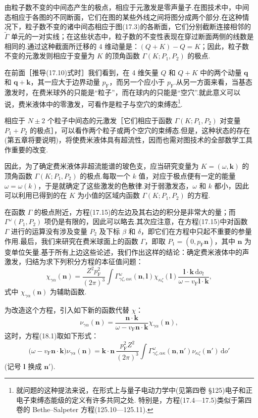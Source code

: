 由粒子数不变的中间态产生的极点，相应于元激发是零声量子.在图技术中，中间态相应于各图的不同断面，它们在图的某些外线之间将图分成两个部分.在这种情况下，粒子数不变的诸中间态相应于图(17.3)的各断面，它们分别截断连接相邻的 $\tilde{\Gamma}$ 单元的一对实线；在这些状态中，粒子数的不变性表现在穿过断面两侧的线数是相同的.通过这种截面所迁移的 4 维动量是：$(Q+K)-Q=K$；因此，粒子数不变的元激发则相应于变量为 $K$ 的顶角函数 $\Gamma(K;P_1,P_2)$ 的极点.

在前面［推导(17.10)式时］我们看到，在 4 维矢量 $Q$ 和 $Q+K$ 中的两个动量 $\bm q$ 和 $\bm q+\bm k$，其一应大于边界动量 $p_{\mathrm{F}}$，而另一个应小于 $p_{\mathrm{F}}$.从另一方面来看，当基态激发时，在费米球外的只能是“粒子”，而在球内的只能是“空穴”.就此意义可以说，费米液体中的零激发，可看作是粒子与空穴的束缚态\footnote{就问题的这种提法来说，在形式上与量子电动力学中(见第四卷 §125)电子和正电子束缚态能级的定义有许多共同之处. 特别是，方程(17.4—17.5)类似于第四卷的 Bethe--Salpeter 方程(125.10—125.11).}.

相应于 $N\pm2$ 个粒子中间态的元激发［它们相应于函数 $\Gamma(K;P_1,P_2)$ 对变量 $P_1+P_2$ 的极点］，可以看作两个粒子或两个空穴的束缚态.但是，这种状态的存在(第五章将要说明)，将使费米液体具有超流性，因而也需对图技术的全部数学工具作重要的改变.

因此，为了确定费米液体非超流能谱的玻色支，应当研究变量为 $K=(\omega,\bm{k})$ 的顶角函数 $\Gamma(K;P_1,P_2)$ 的极点.每取一个 $k$ 值，对应于极点便有一定的能量 $\omega=\omega(k)$，于是就确定了这些激发的色散律.对于弱激发态，$\omega$ 和 $k$ 都小，因此可以利用已得到的在 $K$ 为小值的区域内函数 $\Gamma(K;P_1,P_2)$ 的方程.

在函数 $\Gamma$ 的极点附近，方程(17.15)的左边及其右边的积分是非常大的量；而 $\Gamma^{\omega}(P_1,P_2)$ 项仍是有限的，因此可以略去.其次应注意，在方程(17.15)中对函数 $\Gamma$ 进行的运算没有涉及变量 $P_2$ 及下标 $\beta$ 和 $\delta$，即它们在方程中只起不重要的参量作用.最后，我们来研究在费米球面上的函数 $\Gamma$，即取 $P_1=(0,p_{\mathrm{F}}\bm{n})$，其中 $\bm n$ 为变单位矢量.基于所有上边这些论述，我们作出这样的结论：确定费米液体中的声激发，归结为求下列积分方程的本征值问题：
\begin{equation}
  \chi_{\gamma\alpha}(\bm{n})=\frac{Z^2p_{\mathrm{F}}^2}{(2\pi)^3}\int\Gamma^{\omega}_{\gamma\zeta,\alpha\kappa}(\bm{n},\bm{l})\chi_{\kappa\zeta}(\bm{l})\frac{\bm{l}\cdot\bm{k}\,\mathrm{d}o_l}{\omega-v_{\mathrm{F}}\bm{l}\cdot\bm{k}},
\end{equation}
式中 $\chi_{\gamma\alpha}(\bm n)$ 为辅助函数.

为改造这个方程，引入如下新的函数代替 $\chi$：
\begin{equation}
  \nu_{\gamma\alpha}(\bm{n})=\frac{\bm{n}\cdot\bm{k}}{\omega-v_{\mathrm{F}}\bm{n}\cdot\bm{k}}\chi_{\gamma\alpha}(\bm{n}),
\end{equation}
这时，方程(18.1)取如下形式：
\begin{equation}
  \bigl(\omega-v_{\mathrm{F}}\bm{n}\cdot\bm{k}\bigr)\nu_{\gamma\alpha}(\bm{n})=\bm{k}\cdot\bm{n}\,\frac{p_{\mathrm{F}}^2Z^2}{(2\pi)^3}\int\Gamma^{\omega}_{\gamma\zeta,\alpha\kappa}(\bm{n},\bm{n}')\nu_{\kappa\zeta}(\bm{n}')\,\mathrm{d}o'
\end{equation}
(记号 $\bm l$ 换成 $\bm n'$).

